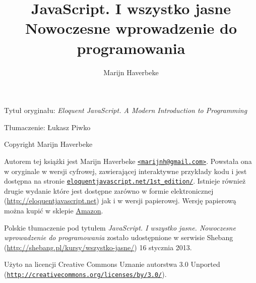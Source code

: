 \documentclass[12pt, sfheadings, oneside, noindentfirst]{mwbk}
\begin{document}
\author{Marijn Haverbeke}
\title{\Huge JavaScript. I wszystko jasne \\ \large Nowoczesne wprowadzenie do programowania}



\maketitle

\setcounter{page}{2}

\noindent Tytuł oryginału: \emph{Eloquent JavaScript. A Modern Introduction to Programming}

\bigskip

\noindent Tłumaczenie: Łukasz Piwko

\bigskip

\noindent \noindent Copyright \textcopyright{} Marijn Haverbeke

\bigskip

Autorem tej książki jest Marijn Haverbeke \texttt{\href{mailto:marijnh@gmail.com}{<marijnh@gmail.com>}}. Powstała ona w oryginale w wersji cyfrowej, zawierającej interaktywne przykłady kodu i jest dostępna na stronie \texttt{\href{http://eloquentjavascript.net/1st\_edition/}{eloquentjavascript.net/1st\_edition/}}. Istnieje również drugie wydanie które jest dostępne zarówno w formie elektronicznej (\url{http://eloquentjavascript.net}) jak i w wersji papierowej. Wersję papierową można kupić w sklepie \href{http://www.amazon.com/gp/product/1593275846/}{Amazon}.

Polskie tłumaczenie pod tytułem \emph{JavaScript. I wszystko jasne. Nowoczesne wprowadzenie do programowania}  zostało udostępnione w serwisie Shebang (\url{http://shebang.pl/kursy/wszystko-jasne/}) 16 stycznia 2013.

Użyto na licencji Creative Commons Uznanie autorstwa 3.0 Unported (\texttt{\href{http://creativecommons.org/licenses/by/3.0/deed.pl}{http://creativecommons.org/licenses/by/3.0/}}).

\setcounter{tocdepth}{0}
\tableofcontents
\setcounter{tocdepth}{2}












\end{document}
